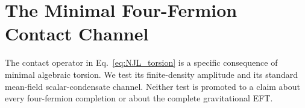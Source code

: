 \documentclass[aps,prd,twocolumn,superscriptaddress,preprintnumbers,nofootinbib,longbibliography,floatfix]{revtex4-2}
\newcommand{\MPl}{M_{\rm Pl}}
\begin{document}

\section{The Minimal Four-Fermion Contact Channel}\label{sec:fourfermion}

The contact operator in Eq.~\eqref{eq:NJL_torsion} is a specific consequence
of minimal algebraic torsion.  We test its finite-density amplitude and its
standard mean-field scalar-condensate channel.  Neither test is promoted to a
claim about every four-fermion completion or about the complete gravitational
EFT.
\end{document}
